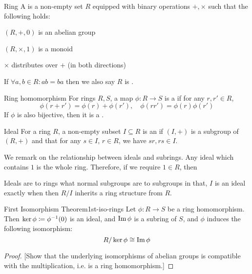 \documentclass{styles/tufte}
\begin{document}
\begin{definition}{Ring}{}
  A  is a non-empty set $R$ equipped with binary operations $+, \times$ such that the following holds:
  \begin{romanenum}
    \item $(R, +, 0)$ is an abelian group
    \item $(R, \times, 1)$ is a monoid
    \item $\times$ distributes over $+$ (in both directions)
  \end{romanenum}
  If $\forall a, b \in R : ab = ba$ then we also say $R$ is .
\end{definition}

\begin{definition}{Ring homomorphism}{}
  For rings $R, S$, a map $\phi : R \to S$ is a  if for any $r, r' \in R$,
  \[ \phi(r + r') = \phi(r) + \phi(r'), \quad \phi(rr') = \phi(r) \phi(r') \]
  If $\phi$ is also bijective, then it is a .
\end{definition}

\begin{definition}{Ideal}{}
  For a ring $R$, a non-empty subset $I \subseteq R$ is an  if $(I, +)$ is a subgroup of $(R, +)$ and that for any $s \in I$, $r \in R$, we have $sr, rs \in I$.
\end{definition}

We remark on the relationship between ideals and subrings. Any ideal which contains $1$ is the whole ring. Therefore, if we require $1 \in R$, then

Ideals are to rings what normal subgroups are to subgroups in that, $I$ is an ideal exactly when then $R/I$ inherits a ring structure from $R$.

\begin{theorem}{First Isomorphism Theorem}{1st-iso-rings}
  Let $\phi: R \to S$ be a ring homomorphism. Then $\ker\phi \coloneqq \phi^{-1}(0)$ is an ideal, and $\operatorname{Im}\phi$ is a subring of $S$, and $\phi$ induces the following isomorphism:
  \[ R/\ker\phi \cong \operatorname{Im}\phi \]
\end{theorem}

\begin{proof}

  [Show that the underlying isomorphisms of abelian groups is compatible with the multiplication, i.e. is a ring homomorphism.]
\end{proof}
\end{document}
